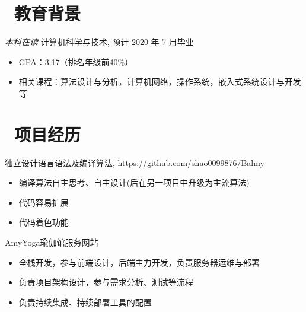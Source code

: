 \documentclass{resume}
\begin{document}


 
\section{\faGraduationCap\  教育背景}
\textit{本科在读} 计算机科学与技术, 预计 2020 年 7 月毕业
\begin{itemize}
  \item GPA：3.17（排名年级前40\%）
  \item 相关课程：算法设计与分析，计算机网络，操作系统，嵌入式系统设计与开发等
\end{itemize}

\section{\faUsers\ 项目经历}

\begin{onehalfspacing}
独立设计语言语法及编译算法, https://github.com/shao0099876/Balmy
\begin{itemize}
  \item 编译算法自主思考、自主设计(后在另一项目中升级为主流算法)
  \item 代码容易扩展
  \item 代码着色功能
\end{itemize}
\end{onehalfspacing}

\begin{onehalfspacing}
AmyYoga瑜伽馆服务网站
\begin{itemize}
  \item 全栈开发，参与前端设计，后端主力开发，负责服务器运维与部署
  \item 负责项目架构设计，参与需求分析、测试等流程
  \item 负责持续集成、持续部署工具的配置
\end{itemize}
\end{onehalfspacing}
\end{document}
